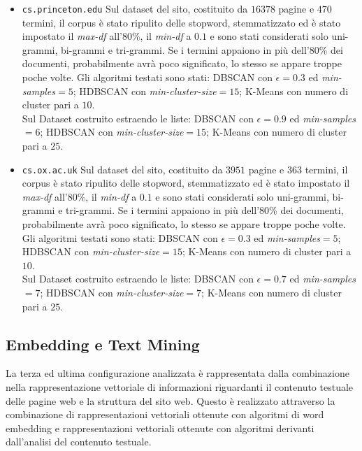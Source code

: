 \begin{itemize}
\item \texttt{cs.princeton.edu}
Sul dataset del sito, costituito da $16378$ pagine e $470$ termini, il corpus è stato ripulito delle stopword, stemmatizzato ed è stato impostato il \textit{max-df} all'80\%, il \textit{min-df} a $0.1$ e sono stati considerati solo uni-grammi, bi-grammi e tri-grammi. Se i termini appaiono in più dell'80\% dei documenti, probabilmente avrà poco significato, lo stesso se appare troppe poche volte. Gli algoritmi testati sono stati: DBSCAN con $\epsilon = 0.3$ ed \textit{min-samples}$ = 5$; HDBSCAN con \textit{min-cluster-size}$=15$; K-Means con numero di cluster pari a $10$. \\Sul Dataset costruito estraendo le liste: DBSCAN con $\epsilon = 0.9$ ed \textit{min-samples}$ = 6$; HDBSCAN con \textit{min-cluster-size}$=15$; K-Means con numero di cluster pari a $25$.  
\item \texttt{cs.ox.ac.uk}
Sul dataset del sito, costituito da $3951$ pagine e $363$ termini, il corpus è stato ripulito delle stopword, stemmatizzato ed è stato impostato il \textit{max-df} all'80\%, il \textit{min-df} a $0.1$ e sono stati considerati solo uni-grammi, bi-grammi e tri-grammi. Se i termini appaiono in più dell'80\% dei documenti, probabilmente avrà poco significato, lo stesso se appare troppe poche volte. Gli algoritmi testati sono stati: DBSCAN con $\epsilon = 0.3$ ed \textit{min-samples}$ = 5$; HDBSCAN con \textit{min-cluster-size}$=15$; K-Means con numero di cluster pari a $10$. \\Sul Dataset costruito estraendo le liste: DBSCAN con $\epsilon = 0.7$ ed \textit{min-samples}$ = 7$; HDBSCAN con \textit{min-cluster-size}$=7$; K-Means con numero di cluster pari a $25$. 
\end{itemize}

\subsection{Embedding e Text Mining}
La terza ed ultima configurazione analizzata è rappresentata dalla combinazione nella rappresentazione vettoriale di informazioni riguardanti il contenuto testuale delle pagine web e la struttura del sito web. Questo è realizzato attraverso la combinazione di rappresentazioni vettoriali ottenute con algoritmi di word embedding e rappresentazioni vettoriali ottenute con algoritmi derivanti dall'analisi del contenuto testuale. 

